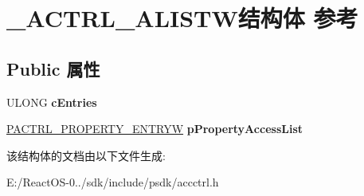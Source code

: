 \hypertarget{struct___a_c_t_r_l___a_l_i_s_t_w}{}\section{\+\_\+\+A\+C\+T\+R\+L\+\_\+\+A\+L\+I\+S\+T\+W结构体 参考}
\label{struct___a_c_t_r_l___a_l_i_s_t_w}
\subsection*{Public 属性}
\begin{DoxyCompactItemize}
\item 
\mbox{\label{struct___a_c_t_r_l___a_l_i_s_t_w_aa8ebaa78f419d56543664ef43130976c}} 
U\+L\+O\+NG {\bfseries c\+Entries}
\item 
\mbox{\label{struct___a_c_t_r_l___a_l_i_s_t_w_a5c523ae7ab80500090cbb3aadd66de72}} 
\hyperlink{struct___a_c_t_r_l___p_r_o_p_e_r_t_y___e_n_t_r_y_w}{P\+A\+C\+T\+R\+L\+\_\+\+P\+R\+O\+P\+E\+R\+T\+Y\+\_\+\+E\+N\+T\+R\+YW} {\bfseries p\+Property\+Access\+List}
\end{DoxyCompactItemize}


该结构体的文档由以下文件生成\+:\begin{DoxyCompactItemize}
\item 
E\+:/\+React\+O\+S-\/0../sdk/include/psdk/accctrl.\+h\end{DoxyCompactItemize}
